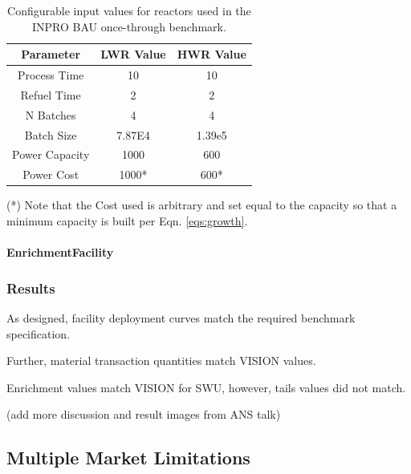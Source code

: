 \begin{table}[h]
\centering
\begin{threeparttable}
\begin{tabular}{ccc}
Parameter      & LWR Value & HWR Value               \\ \hline
Process Time   & 10         & 10                       \\
Refuel Time    & 2          & 2                        \\
N Batches      & 4          & 4                        \\
Batch Size     & 7.87E4     & 1.39e5                   \\
Power Capacity & 1000       & 600                      \\
Power Cost     & 1000*      & 600* \\ \hline
\end{tabular}
\begin{tablenotes}
  \small
  \item (*) Note that the Cost used is arbitrary and set equal to the
  capacity so that a minimum capacity is built per Eqn. \ref{eqs:growth}.
\end{tablenotes}
\caption{Configurable input values for reactors used in the INPRO BAU once-through benchmark.}
\label{tbl:inprorxtr}
\end{threeparttable}
\end{table}

\paragraph{EnrichmentFacility}

\subsubsection{Results}

As designed, facility deployment curves match the required benchmark specification. 

Further, material transaction quantities match VISION values.

Enrichment values match VISION for SWU, however, tails values did not match.

(add more discussion and result images from ANS talk)

\subsection{Multiple Market Limitations}\label{abm:abm:limits}

